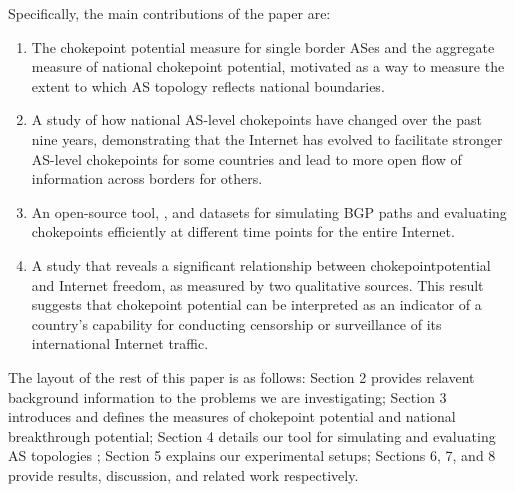 






\par
Specifically, the main contributions of the paper are: 
\begin{enumerate}
 \item The chokepoint potential measure for single border ASes and the 
 aggregate measure of national chokepoint potential, motivated as a way to measure the extent to which AS topology reflects national boundaries.

 \item A study of how national AS-level chokepoints have changed over the past nine years, demonstrating that the Internet has evolved to facilitate stronger
 AS-level chokepoints for some countries and lead to more open flow of information across borders for others.
 \item An open-source tool, \toolname{}, and datasets for simulating BGP paths and evaluating chokepoints efficiently at different time points for the entire Internet.  
 \item A study that reveals a significant relationship between chokepointpotential and Internet freedom, as measured by two qualitative sources.  This result suggests that chokepoint potential can be interpreted as an indicator of a country's capability for conducting censorship or surveillance of its international Internet traffic.
\end{enumerate}


\par
The layout of the rest of this paper is as follows: Section 2 provides relavent background information
to the problems we are investigating; Section 3 introduces and defines the measures of chokepoint
potential and national breakthrough potential; Section 4 details our tool for simulating and evaluating 
AS topologies \toolname{}; Section 5
explains our experimental setups; Sections 6, 7, and 8 provide results, discussion, and related work
respectively.
